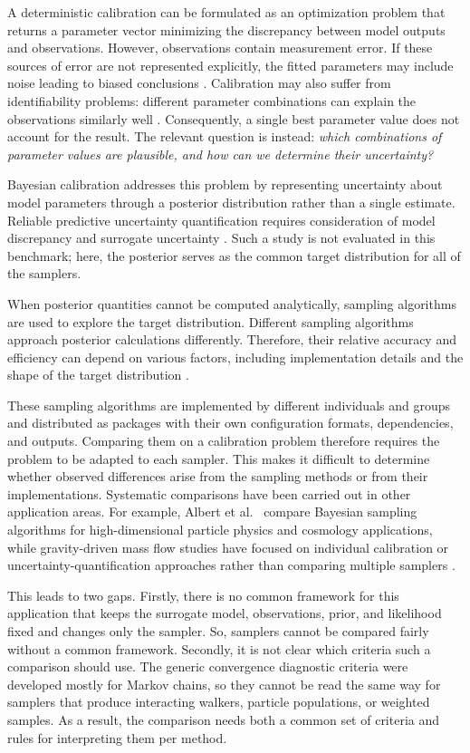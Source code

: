 A deterministic calibration can be formulated as an optimization problem that returns a parameter vector minimizing the discrepancy between model outputs and observations. However, observations contain measurement error. If these sources of error are not represented explicitly, the fitted parameters may include noise leading to biased conclusions \autocite{Kennedy2001,Brynjarsdottir2014}. Calibration may also suffer from identifiability problems: different parameter combinations can explain the observations similarly well \autocite{Arendt2012}. Consequently, a single best parameter value does not account for the result. The relevant question is instead: \emph{which combinations of parameter values are plausible, and how can we determine their uncertainty?}

Bayesian calibration addresses this problem by representing uncertainty about model parameters through a posterior distribution rather than a single estimate. Reliable predictive uncertainty quantification requires consideration of model discrepancy and surrogate uncertainty \autocite{Brynjarsdottir2014,Yildiz2023}. Such a study is not evaluated in this benchmark; here, the posterior serves as the common target distribution for all of the samplers.

When posterior quantities cannot be computed analytically, sampling algorithms are used to explore the target distribution. Different sampling algorithms approach posterior calculations differently. Therefore, their relative accuracy and efficiency can depend on various factors, including implementation details and the shape of the target distribution \autocite{Albert2025}.

These sampling algorithms are implemented by different individuals and groups and distributed as packages with their own configuration formats, dependencies, and outputs. Comparing them on a calibration problem therefore requires the problem to be adapted to each sampler. This makes it difficult to determine whether observed differences arise from the sampling methods or from their implementations. Systematic comparisons have been carried out in other application areas. For example, Albert et al.~\cite{Albert2025} compare Bayesian sampling algorithms for high-dimensional particle physics and cosmology applications, while gravity-driven mass flow studies have focused on individual calibration or uncertainty-quantification approaches rather than comparing multiple samplers \cite{Heredia2020,Yildiz2023,ZhaoKowalski2022}.

This leads to two gaps. Firstly, there is no common framework for this application that keeps the surrogate model, observations, prior, and likelihood fixed and changes only the sampler. So, samplers cannot be compared fairly without a common framework. Secondly, it is not clear which criteria such a comparison should use. The generic convergence diagnostic criteria were developed mostly for Markov chains, so they cannot be read the same way for samplers that produce interacting walkers, particle populations, or weighted samples. As a result, the comparison needs both a common set of criteria and rules for interpreting them per method.

